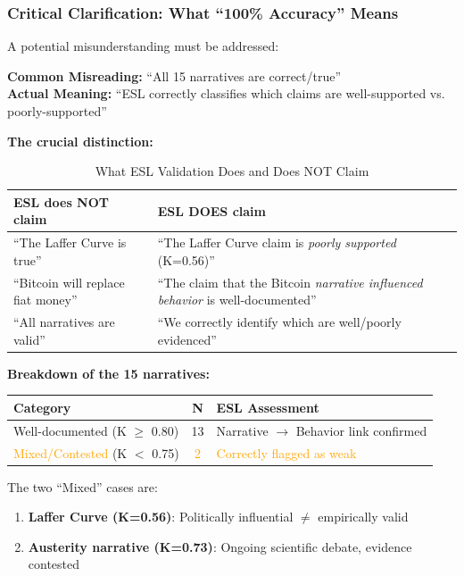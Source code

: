 \documentclass[11pt,a4paper]{article}
\begin{document}
\subsubsection{Critical Clarification: What ``100\% Accuracy'' Means}

A potential misunderstanding must be addressed:

\begin{warningbox}
\textbf{Common Misreading:} ``All 15 narratives are correct/true'' \\[0.5em]
\textbf{Actual Meaning:} ``ESL correctly classifies which claims are well-supported vs. poorly-supported''
\end{warningbox}

\textbf{The crucial distinction:}

\begin{table}[h]
\centering
\caption{What ESL Validation Does and Does NOT Claim}
\begin{tabular}{p{6cm}p{6cm}}
\toprule
\textbf{ESL does NOT claim} & \textbf{ESL DOES claim} \\
\midrule
``The Laffer Curve is true'' & ``The Laffer Curve claim is \textit{poorly supported} (K=0.56)'' \\
\addlinespace
``Bitcoin will replace fiat money'' & ``The claim that the Bitcoin \textit{narrative influenced behavior} is well-documented'' \\
\addlinespace
``All narratives are valid'' & ``We correctly identify which are well/poorly evidenced'' \\
\bottomrule
\end{tabular}
\end{table}

\textbf{Breakdown of the 15 narratives:}

\begin{table}[h]
\centering
\begin{tabular}{lcl}
\toprule
\textbf{Category} & \textbf{N} & \textbf{ESL Assessment} \\
\midrule
Well-documented (K $\geq$ 0.80) & 13 & Narrative $\to$ Behavior link confirmed \\
\textcolor{orange}{Mixed/Contested} (K $<$ 0.75) & \textcolor{orange}{2} & \textcolor{orange}{Correctly flagged as weak} \\
\bottomrule
\end{tabular}
\end{table}

The two ``Mixed'' cases are:
\begin{enumerate}
    \item \textbf{Laffer Curve (K=0.56)}: Politically influential $\neq$ empirically valid
    \item \textbf{Austerity narrative (K=0.73)}: Ongoing scientific debate, evidence contested
\end{enumerate}
\end{document}
